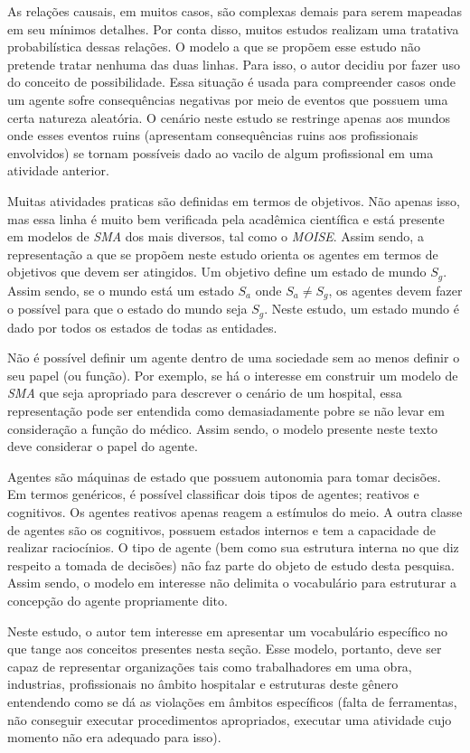 \documentclass[12pt]{article}
\begin{document}
As relações causais, em muitos casos, são complexas demais para serem mapeadas em seu mínimos detalhes. Por conta disso, muitos estudos realizam uma tratativa probabilística dessas relações. O modelo a que se propõem esse estudo não pretende tratar nenhuma das duas linhas. Para isso, o autor decidiu por fazer uso do conceito de possibilidade. Essa situação é usada para compreender casos onde um agente sofre consequências negativas por meio de eventos que possuem uma certa natureza aleatória. O cenário neste estudo se restringe apenas aos mundos onde esses eventos ruins (apresentam consequências ruins aos profissionais envolvidos) se tornam possíveis dado ao vacilo de algum profissional em uma atividade anterior.   


Muitas atividades praticas são definidas em termos de objetivos. Não apenas isso, mas essa linha é muito bem verificada pela acadêmica científica e está presente em modelos de \textit{SMA} dos mais diversos, tal como o \textit{MOISE}. Assim sendo, a representação a que se propõem neste estudo orienta os agentes em termos de objetivos que devem ser atingidos. Um objetivo define um estado de mundo $S_g$. Assim sendo, se o mundo está um estado $S_a$ onde $S_a \neq S_g$, os agentes devem fazer o possível para que o estado do mundo seja $S_g$. Neste estudo, um estado mundo é dado por todos os estados de todas as entidades.

Não é possível definir um agente dentro de uma sociedade sem ao menos definir o seu papel (ou função). Por exemplo, se há o interesse em construir um modelo de \textit{SMA} que seja apropriado para descrever o cenário de um hospital, essa representação pode ser entendida como demasiadamente pobre se não levar em consideração a função do médico. Assim sendo, o modelo presente neste texto deve considerar o papel do agente. 

Agentes são máquinas de estado que possuem autonomia para tomar decisões. Em termos genéricos, é possível classificar dois tipos de agentes; reativos e cognitivos. Os agentes reativos apenas reagem a estímulos do meio. A outra classe de agentes são os cognitivos, possuem estados internos e tem a capacidade de realizar raciocínios. O tipo de agente (bem como sua estrutura interna no que diz respeito a tomada de decisões) não faz parte do objeto de estudo desta pesquisa. Assim sendo, o modelo em interesse não delimita o vocabulário para estruturar a concepção do agente propriamente dito. 


Neste estudo, o autor tem interesse em apresentar um vocabulário específico no que tange aos conceitos presentes nesta seção. Esse modelo, portanto, deve ser capaz de representar organizações tais como trabalhadores em uma obra, industrias, profissionais no âmbito hospitalar e estruturas deste gênero entendendo como se dá as violações em âmbitos específicos (falta de ferramentas, não conseguir executar procedimentos apropriados, executar uma atividade cujo momento não era adequado para isso). 
\end{document}
